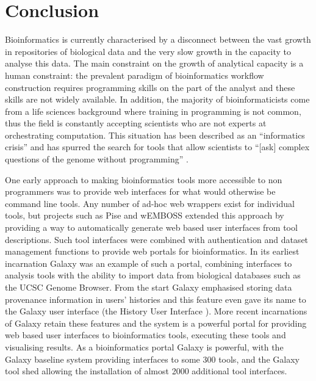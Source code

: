 \documentclass[a4paper,10pt]{scrreprt}
\begin{document}
\section{Conclusion}

Bioinformatics is currently characterised by a disconnect between the vast growth in repositories of biological data and the very slow growth in the capacity to analyse this data. The main constraint on the growth of analytical capacity is a human constraint: the prevalent paradigm of bioinformatics workflow construction requires programming skills on the part of the analyst and these skills are not widely available. In addition, the majority of bioinformaticists come from a life sciences background where training in programming is not common, thus the field is constantly accepting scientists who are not experts at orchestrating computation. This situation has been described as an ``informatics crisis'' \cite{goecks_galaxy:_2010} and has spurred the search for tools that allow scientists to ``[ask] complex questions of the genome without programming'' \cite{woollard_asking_2010}.

One early approach to making bioinformatics tools more accessible to non programmers was to provide web interfaces for what would otherwise be command line tools. Any number of ad-hoc web wrappers exist for individual tools, but projects such as Pise \cite{gilbert_pise:_2002} and wEMBOSS \cite{sarachu_wemboss:_2005} extended this approach by providing a way to automatically generate web based user interfaces from tool descriptions. Such tool interfaces were combined with authentication and dataset management functions to provide web portals for bioinformatics. In its earliest incarnation Galaxy \cite{nekrutenko_introduction_2011} was an example of such a portal, combining interfaces to analysis tools with the ability to import data from biological databases such as the UCSC Genome Browser. From the start Galaxy emphasised storing data provenance information in users' histories and this feature even gave its name to the Galaxy user interface (the History User Interface \cite{giardine_galaxy:_2005}). More 
recent incarnations of Galaxy retain these features and the system is a powerful portal for providing web based user interfaces to bioinformatics tools, executing these tools and visualising results. As a bioinformatics portal Galaxy is powerful, with the Galaxy baseline system providing interfaces to some 300 tools, and the Galaxy tool shed allowing the installation of almost 2000 additional tool interfaces.
\end{document}
